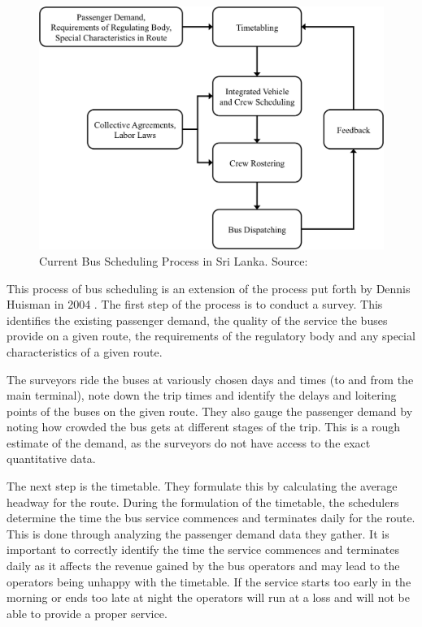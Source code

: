 \begin{figure}[h!]
\centering
\includegraphics [scale=0.7] {currentBusSchedulingProcess}
\caption[Current Bus Scheduling Process in SL]{Current Bus Scheduling Process in Sri Lanka. Source: \cite{Piyadasa2005}}
\label{image-currentBusSchedulingProcess}
\end{figure}

This process of bus scheduling is an extension of the process put forth by Dennis Huisman in 2004 \cite{Piyadasa2005}. The first step of the process is to conduct a survey. This identifies the existing passenger demand, the quality of the service the buses provide on a given route, the requirements of the regulatory body and any special characteristics of a given route. 

The surveyors ride the buses at variously chosen days and times (to and from the main terminal), note down the trip times and identify the delays and loitering points of the buses on the given route. They also gauge the passenger demand by noting how crowded the bus gets at different stages of the trip. This is a rough estimate of the demand, as the surveyors do not have access to the exact quantitative data.

The next step is the timetable. They formulate this by calculating the average headway for the route. During the formulation of the timetable, the schedulers determine the time the bus service commences and terminates daily for the route. This is done through analyzing the passenger demand data they gather. It is important to correctly identify the time the service commences and terminates daily as it affects the revenue gained by the bus operators and may lead to the operators being unhappy with the timetable. If the service starts too early in the morning or ends too late at night the operators will run at a loss and will not be able to provide a proper service.

